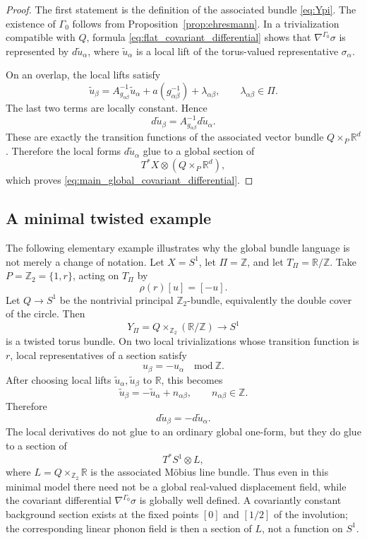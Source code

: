 \documentclass[11pt]{amsart}
\theoremstyle{plain}
\theoremstyle{definition}
\theoremstyle{remark}
\begin{document}
\begin{proof}
	The first statement is the definition of the associated bundle \eqref{eq:Ypi}. 
	The existence of \(\Gamma_0\) follows from Proposition~\ref{prop:ehresmann}. 
	In a trivialization compatible with \(Q\), formula \eqref{eq:flat_covariant_differential} shows that \(\nabla^{\Gamma_0}\sigma\) is represented by \(d\widetilde u_\alpha\), where \(\widetilde u_\alpha\) is a local lift of the torus-valued representative \(\sigma_\alpha\).
	
	On an overlap, the local lifts satisfy
	\[
	\widetilde u_\beta
	=
	A_{g_{\alpha\beta}}^{-1}\widetilde u_\alpha
	+
	a(g_{\alpha\beta}^{-1})
	+
	\lambda_{\alpha\beta},
	\qquad
	\lambda_{\alpha\beta}\in\Pi.
	\]
	The last two terms are locally constant. Hence
	\[
	d\widetilde u_\beta
	=
	A_{g_{\alpha\beta}}^{-1}d\widetilde u_\alpha.
	\]
	These are exactly the transition functions of the associated vector bundle \(Q\times_P\mathbb R^d\). 
	Therefore the local forms \(d\widetilde u_\alpha\) glue to a global section of
	\[
	T^*X\otimes(Q\times_P\mathbb R^d),
	\]
	which proves \eqref{eq:main_global_covariant_differential}.
\end{proof}

\subsection{A minimal twisted example}
\label{subsec:twisted_example}

The following elementary example illustrates why the global bundle language is not merely a change of notation. 
Let \(X=S^1\), let \(\Pi=\mathbb Z\), and let \(T_\Pi=\mathbb R/\mathbb Z\). 
Take \(P=\mathbb Z_2=\{1,r\}\), acting on \(T_\Pi\) by
\[
\rho(r)[u]=[-u].
\]
Let \(Q\to S^1\) be the nontrivial principal \(\mathbb Z_2\)-bundle, equivalently the double cover of the circle. 
Then
\[
Y_\Pi=Q\times_{\mathbb Z_2}(\mathbb R/\mathbb Z)\to S^1
\]
is a twisted torus bundle. 
On two local trivializations whose transition function is \(r\), local representatives of a section satisfy
\[
u_\beta=-u_\alpha\quad \mathrm{mod}\ \mathbb Z.
\]
After choosing local lifts \(\widetilde u_\alpha,\widetilde u_\beta\) to \(\mathbb R\), this becomes
\[
\widetilde u_\beta=-\widetilde u_\alpha+n_{\alpha\beta},
\qquad n_{\alpha\beta}\in\mathbb Z.
\]
Therefore
\[
d\widetilde u_\beta=-d\widetilde u_\alpha.
\]
The local derivatives do not glue to an ordinary global one-form, but they do glue to a section of
\[
T^*S^1\otimes L,
\]
where \(L=Q\times_{\mathbb Z_2}\mathbb R\) is the associated M\"obius line bundle. 
Thus even in this minimal model there need not be a global real-valued displacement field, while the covariant differential \(\nabla^{\Gamma_0}\sigma\) is globally well defined. 
A covariantly constant background section exists at the fixed points \([0]\) and \([1/2]\) of the involution; the corresponding linear phonon field is then a section of \(L\), not a function on \(S^1\).
\end{document}
